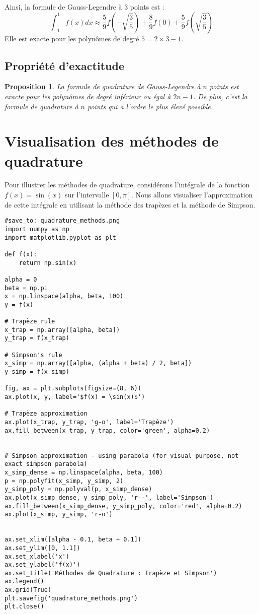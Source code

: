 \documentclass{article}
\newtheorem{proposition}[theorem]{Proposition}
\begin{document}
Ainsi, la formule de Gauss-Legendre à 3 points est :
\[
\int_{-1}^{1} f(x) dx \approx \frac{5}{9} f\left(-\sqrt{\frac{3}{5}}\right) + \frac{8}{9} f(0) + \frac{5}{9} f\left(\sqrt{\frac{3}{5}}\right)
\]
Elle est exacte pour les polynômes de degré $5 = 2 \times 3 - 1$.

\subsection{Propriété d'exactitude}

\begin{proposition}
La formule de quadrature de Gauss-Legendre à $n$ points est exacte pour les polynômes de degré inférieur ou égal à $2n-1$.  De plus, c'est la formule de quadrature à $n$ points qui a l'ordre le plus élevé possible.
\end{proposition}

\section{Visualisation des méthodes de quadrature}

Pour illustrer les méthodes de quadrature, considérons l'intégrale de la fonction $f(x) = \sin(x)$ sur l'intervalle $[0, \pi]$. Nous allons visualiser l'approximation de cette intégrale en utilisant la méthode des trapèzes et la méthode de Simpson.

\begin{verbatim}
#save_to: quadrature_methods.png
import numpy as np
import matplotlib.pyplot as plt

def f(x):
    return np.sin(x)

alpha = 0
beta = np.pi
x = np.linspace(alpha, beta, 100)
y = f(x)

# Trapèze rule
x_trap = np.array([alpha, beta])
y_trap = f(x_trap)

# Simpson's rule
x_simp = np.array([alpha, (alpha + beta) / 2, beta])
y_simp = f(x_simp)

fig, ax = plt.subplots(figsize=(8, 6))
ax.plot(x, y, label='$f(x) = \sin(x)$')

# Trapèze approximation
ax.plot(x_trap, y_trap, 'g-o', label='Trapèze')
ax.fill_between(x_trap, y_trap, color='green', alpha=0.2)


# Simpson approximation - using parabola (for visual purpose, not exact simpson parabola)
x_simp_dense = np.linspace(alpha, beta, 100)
p = np.polyfit(x_simp, y_simp, 2)
y_simp_poly = np.polyval(p, x_simp_dense)
ax.plot(x_simp_dense, y_simp_poly, 'r--', label='Simpson')
ax.fill_between(x_simp_dense, y_simp_poly, color='red', alpha=0.2)
ax.plot(x_simp, y_simp, 'r-o')


ax.set_xlim([alpha - 0.1, beta + 0.1])
ax.set_ylim([0, 1.1])
ax.set_xlabel('x')
ax.set_ylabel('f(x)')
ax.set_title('Méthodes de Quadrature : Trapèze et Simpson')
ax.legend()
ax.grid(True)
plt.savefig('quadrature_methods.png')
plt.close()
\end{verbatim}
\end{document}
